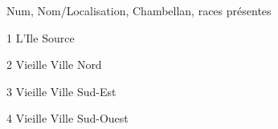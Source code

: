 Num, Nom/Localisation, Chambellan, races présentes

1 L'Ile Source

2 Vieille Ville Nord

3 Vieille Ville Sud-Est

4 Vieille Ville Sud-Ouest
